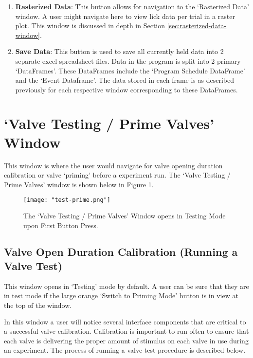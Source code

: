 \documentclass{article}
\begin{document}
\begin{enumerate}
    \item \textbf{Rasterized Data}: This button allows for navigation to the `Rasterized Data' window. A user might navigate here to view 
        lick data per trial in a raster plot. This window is discussed in depth in Section \ref{sec:rasterized-data-window}.
    \item \textbf{Save Data}: This button is used to save all currently held data into 2 separate excel spreadsheet files. Data in the program 
        is split into 2 primary `DataFrames'. These DataFrames include the `Program Schedule DataFrame' and the `Event Dataframe'. The data 
        stored in each frame is as described previously for each respective window corresponding to these DataFrames.
\end{enumerate}

\newpage
\section{`Valve Testing / Prime Valves' Window}
\label{sec:valve-testing-window}
This window is where the user would navigate for valve opening duration calibration or valve `priming' before a experiment run. The 
`Valve Testing / Prime Valves' window is shown below in Figure \ref{fig:test-prime}.

\begin{figure}[h!]
        \centering
        \texttt{[image: "test-prime.png"]}
        \caption{The `Valve Testing / Prime Valves' Window opens in Testing Mode upon First Button Press.}
        \label{fig:test-prime}
\end{figure}
\FloatBarrier

\newpage

\subsection{Valve Open Duration Calibration (Running a Valve Test)}
\label{sec:valve-profiles-how-to}
This window opens in `Testing' mode by default. A user can be sure that they are in test mode if the large orange `Switch to Priming Mode' 
button is in view at the top of the window. 

In this window a user will notice several interface components that are critical to a
successful valve calibration. Calibration is important to run often to ensure that each valve is delivering the proper amount of stimulus 
on each valve in use during an experiment. The process of running a valve test procedure is described below.
\end{document}
